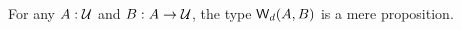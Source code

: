 \documentclass[hott-all.tex]{subfiles}
\begin{document}
% 
% 
% 
\begin{thm}
  For any $A : \mathcal{U}$ and $B : A \to \mathcal{U}$, the type $\mathsf{W}_d(A,B)$ is a mere proposition.
\end{thm}
% 
%
\end{document}
